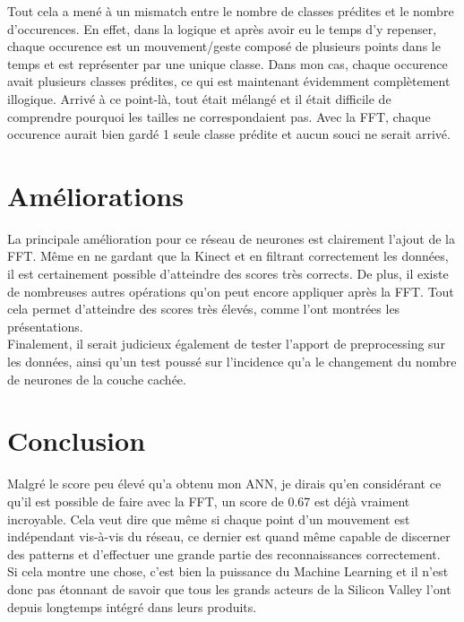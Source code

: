Tout cela a mené à un mismatch entre le nombre de classes prédites et le nombre d'occurences. En effet, dans la logique et après avoir eu le temps d'y repenser, chaque occurence est un mouvement/geste composé de plusieurs points dans le temps et est représenter par une unique classe. Dans mon cas, chaque occurence avait plusieurs classes prédites, ce qui est maintenant évidemment complètement illogique. Arrivé à ce point-là, tout était mélangé et il était difficile de comprendre pourquoi les tailles ne correspondaient pas. Avec la FFT, chaque occurence aurait bien gardé 1 seule classe prédite et aucun souci ne serait arrivé.

\section*{Améliorations}

La principale amélioration pour ce réseau de neurones est clairement l'ajout de la FFT. Même en ne gardant que la Kinect et en filtrant correctement les données, il est certainement possible d'atteindre des scores très corrects. De plus, il existe de nombreuses autres opérations qu'on peut encore appliquer après la FFT. Tout cela permet d'atteindre des scores très élevés, comme l'ont montrées les présentations.\\

Finalement, il serait judicieux également de tester l'apport de preprocessing sur les données, ainsi qu'un test poussé sur l'incidence qu'a le changement du nombre de neurones de la couche cachée.

\section*{Conclusion}

Malgré le score peu élevé qu'a obtenu mon ANN, je dirais qu'en considérant ce qu'il est possible de faire avec la FFT, un score de 0.67 est déjà vraiment incroyable. Cela veut dire que même si chaque point d'un mouvement est indépendant vis-à-vis du réseau, ce dernier est quand même capable de discerner des patterns et d'effectuer une grande partie des reconnaissances correctement. \\

Si cela montre une chose, c'est bien la puissance du Machine Learning et il n'est donc pas étonnant de savoir que tous les grands acteurs de la Silicon Valley l'ont depuis longtemps intégré dans leurs produits.
 
 
 

